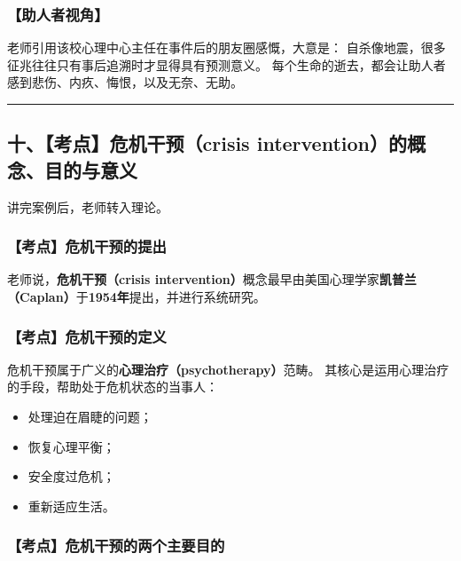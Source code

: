 \documentclass[
  chinese,
  9pt,
  a4paper,
]{ctexart}
\providecommand{\tightlist}{%
  \setlength{\itemsep}{0pt}\setlength{\parskip}{0pt}}
\begin{document}
\subsubsection{【助人者视角】}\label{ux52a9ux4ebaux8005ux89c6ux89d2}

老师引用该校心理中心主任在事件后的朋友圈感慨，大意是：
自杀像地震，很多征兆往往只有事后追溯时才显得具有预测意义。
每个生命的逝去，都会让助人者感到悲伤、内疚、悔恨，以及无奈、无助。

\begin{center}\rule{0.5\linewidth}{0.5pt}\end{center}

\subsection{十、【考点】危机干预（crisis
intervention）的概念、目的与意义}\label{ux5341ux8003ux70b9ux5371ux673aux5e72ux9884crisis-interventionux7684ux6982ux5ff5ux76eeux7684ux4e0eux610fux4e49}

讲完案例后，老师转入理论。

\subsubsection{【考点】危机干预的提出}\label{ux8003ux70b9ux5371ux673aux5e72ux9884ux7684ux63d0ux51fa}

老师说，\textbf{危机干预（crisis
intervention）}概念最早由美国心理学家\textbf{凯普兰（Caplan）}于\textbf{1954年}提出，并进行系统研究。

\subsubsection{【考点】危机干预的定义}\label{ux8003ux70b9ux5371ux673aux5e72ux9884ux7684ux5b9aux4e49}

危机干预属于广义的\textbf{心理治疗（psychotherapy）}范畴。
其核心是运用心理治疗的手段，帮助处于危机状态的当事人：

\begin{itemize}
\tightlist
\item
  处理迫在眉睫的问题；
\item
  恢复心理平衡；
\item
  安全度过危机；
\item
  重新适应生活。
\end{itemize}

\subsubsection{【考点】危机干预的两个主要目的}\label{ux8003ux70b9ux5371ux673aux5e72ux9884ux7684ux4e24ux4e2aux4e3bux8981ux76eeux7684}
\end{document}
